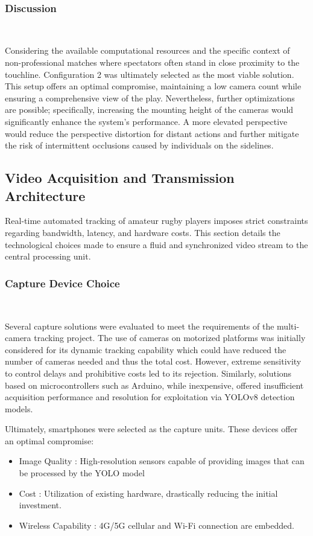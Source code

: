 \documentclass[conference]{IEEEtran}
\begin{document}
\
\subsubsection{Discussion}\


Considering the available computational resources and the specific context of non-professional matches where spectators often stand in close proximity to the touchline. Configuration 2 was ultimately selected as the most viable solution. This setup offers an optimal compromise, maintaining a low camera count while ensuring a comprehensive view of the play. Nevertheless, further optimizations are possible; specifically, increasing the mounting height of the cameras would significantly enhance the system's performance. A more elevated perspective would reduce the perspective distortion for distant actions and further mitigate the risk of intermittent occlusions caused by individuals on the sidelines.




\subsection{Video Acquisition and Transmission Architecture}
Real-time automated tracking of amateur rugby players imposes strict constraints regarding bandwidth, latency, and hardware costs. This section details the technological choices made to ensure a fluid and synchronized video stream to the central processing unit.
\subsubsection{Capture Device Choice}\


Several capture solutions were evaluated to meet the requirements of the multi-camera tracking project. The use of cameras on motorized platforms was initially considered for its dynamic tracking capability which could have reduced the number of cameras needed and thus the total cost. However, extreme sensitivity to control delays and prohibitive costs led to its rejection. Similarly, solutions based on microcontrollers such as Arduino, while inexpensive, offered insufficient acquisition performance and resolution for exploitation via YOLOv8 detection models.

Ultimately, smartphones were selected as the capture units. These devices offer an optimal compromise:
\begin{itemize}
    \item Image Quality : High-resolution sensors capable of providing images that can be processed by the YOLO model
    \item Cost : Utilization of existing hardware, drastically reducing the initial investment.
    \item Wireless Capability : 4G/5G cellular and Wi-Fi connection are embedded.
\end{itemize}
\end{document}
